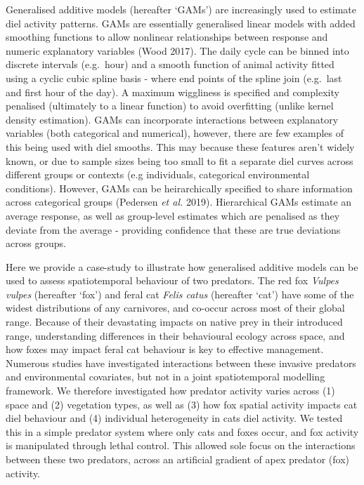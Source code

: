 \documentclass[11pt,a4paper,titlepage,twoside,openright]{style/unimelbthesis}
\begin{document}
\begin{mainmatter}
Generalised additive models (hereafter `GAMs') are increasingly used to estimate diel activity patterns. GAMs are essentially generalised linear models with added smoothing functions to allow nonlinear relationships between response and numeric explanatory variables (Wood 2017). The daily cycle can be binned into discrete intervals (e.g.~hour) and a smooth function of animal activity fitted using a cyclic cubic spline basis - where end points of the spline join (e.g.~last and first hour of the day). A maximum wiggliness is specified and complexity penalised (ultimately to a linear function) to avoid overfitting (unlike kernel density estimation). GAMs can incorporate interactions between explanatory variables (both categorical and numerical), however, there are few examples of this being used with diel smooths. This may because these features aren't widely known, or due to sample sizes being too small to fit a separate diel curves across different groups or contexts (e.g individuals, categorical environmental conditions). However, GAMs can be heirarchically specified to share information across categorical groups (Pedersen \emph{et al.} 2019). Hierarchical GAMs estimate an average response, as well as group-level estimates which are penalised as they deviate from the average - providing confidence that these are true deviations across groups.

Here we provide a case-study to illustrate how generalised additive models can be used to assess spatiotemporal behaviour of two predators. The red fox \emph{Vulpes vulpes} (hereafter `fox') and feral cat \emph{Felis catus} (hereafter `cat') have some of the widest distributions of any carnivores, and co-occur across most of their global range. Because of their devastating impacts on native prey in their introduced range, understanding differences in their behavioural ecology across space, and how foxes may impact feral cat behaviour is key to effective management. Numerous studies have investigated interactions between these invasive predators and environmental covariates, but not in a joint spatiotemporal modelling framework. We therefore investigated how predator activity varies across (1) space and (2) vegetation types, as well as (3) how fox spatial activity impacts cat diel behaviour and (4) individual heterogeneity in cats diel activity. We tested this in a simple predator system where only cats and foxes occur, and fox activity is manipulated through lethal control. This allowed sole focus on the interactions between these two predators, across an artificial gradient of apex predator (fox) activity.


\end{mainmatter}
\end{document}
